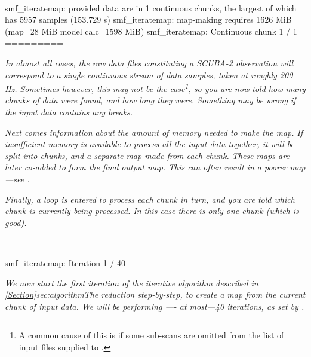 ~
\begin{terminalv}
smf_iteratemap: provided data are in 1 continuous chunks, the largest of which
has 5957 samples (153.729 s)
smf_iteratemap: map-making requires 1626 MiB (map=28 MiB model calc=1598 MiB)
smf_iteratemap: Continuous chunk 1 / 1 =========
\end{terminalv}

\emph{In almost all cases, the raw data files constituting a SCUBA-2
observation will correspond to a single continuous stream of data
samples, taken at roughly 200 Hz. Sometimes however, this may not be the
case\footnote{A common cause of this is if some sub-scans are omitted
from the list of input files supplied to .}, so you are
now told how many chunks of data were found, and how long they were.
Something may be wrong if the input data contains any breaks.}

\emph{Next comes information about the amount of memory needed to make
the map. If insufficient memory is available to process all the input
data together, it will be split into chunks, and a separate map made from
each chunk. These maps are later co-added to form the final output map.
This can often result in a poorer map---see 
{}.}

\emph{Finally, a loop is entered to process each chunk in turn, and
you are told which chunk is currently being processed. In this
case there is only one chunk (which is good).}

~
\begin{terminalv}
smf_iteratemap: Iteration 1 / 40 ---------------
\end{terminalv}

\emph{We now start the first iteration of the iterative algorithm described in
\cref{Section}{sec:algorithm}{The reduction step-by-step}, to create a
map from the current chunk of  input data. We will be performing ----
at most---40 iterations, as set by .}


